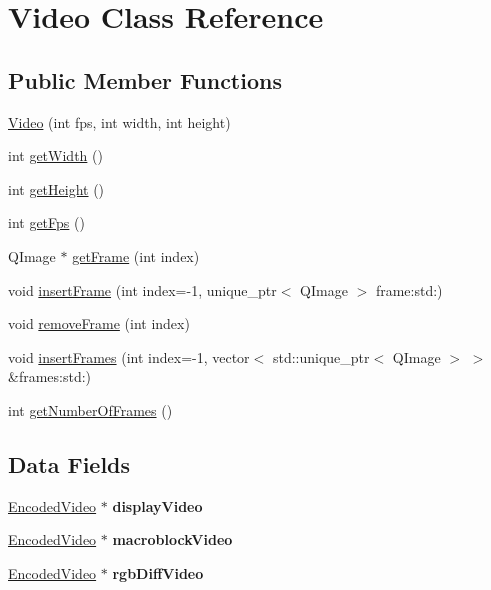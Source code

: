 \hypertarget{classPlayer_1_1Video}{}\section{Video Class Reference}
\label{classPlayer_1_1Video}
\subsection*{Public Member Functions}
\begin{DoxyCompactItemize}
\item 
\hyperlink{classPlayer_1_1Video_ab82b351b35612f4226f75726d958831b}{Video} (int fps, int width, int height)
\item 
int \hyperlink{classPlayer_1_1Video_a67a0997183f24da19b776d96c1052998}{get\+Width} ()
\item 
int \hyperlink{classPlayer_1_1Video_a07efb2a4e9a982688c8bb3c3f21d1092}{get\+Height} ()
\item 
int \hyperlink{classPlayer_1_1Video_a519ad5c0664b9de28c1a6d9dc77f959d}{get\+Fps} ()
\item 
Q\+Image $\ast$ \hyperlink{classPlayer_1_1Video_aa350d9b9ba7bad72aeda171dcc537c10}{get\+Frame} (int index)
\item 
void \hyperlink{classPlayer_1_1Video_a099c54fc35c34a3231a9b5a6d9fe6d18}{insert\+Frame} (int index=-\/1, unique\+\_\+ptr$<$ Q\+Image $>$ frame\+:std\+:)
\item 
void \hyperlink{classPlayer_1_1Video_a2467a8d0c175fdcbacea59e9955d88a9}{remove\+Frame} (int index)
\item 
void \hyperlink{classPlayer_1_1Video_ab77b9ebd7677bbb317c511fa48d61aa6}{insert\+Frames} (int index=-\/1, vector$<$ std\+::unique\+\_\+ptr$<$ Q\+Image $>$ $>$ \&frames\+:std\+:)
\item 
int \hyperlink{classPlayer_1_1Video_a038091d64aa83552571228512789d5ee}{get\+Number\+Of\+Frames} ()
\end{DoxyCompactItemize}
\subsection*{Data Fields}
\begin{DoxyCompactItemize}
\item 
\hypertarget{classPlayer_1_1Video_af2ff8e21024ff9694a889492a405db82}{}\hyperlink{classEncodedVideo}{Encoded\+Video} $\ast$ {\bfseries display\+Video}\label{classPlayer_1_1Video_af2ff8e21024ff9694a889492a405db82}

\item 
\hypertarget{classPlayer_1_1Video_ae6a80b804a1b595e80d770816e184838}{}\hyperlink{classEncodedVideo}{Encoded\+Video} $\ast$ {\bfseries macroblock\+Video}\label{classPlayer_1_1Video_ae6a80b804a1b595e80d770816e184838}

\item 
\hypertarget{classPlayer_1_1Video_a084ea62ca5a7ddeee9c02044140d4c20}{}\hyperlink{classEncodedVideo}{Encoded\+Video} $\ast$ {\bfseries rgb\+Diff\+Video}\label{classPlayer_1_1Video_a084ea62ca5a7ddeee9c02044140d4c20}

\end{DoxyCompactItemize}


